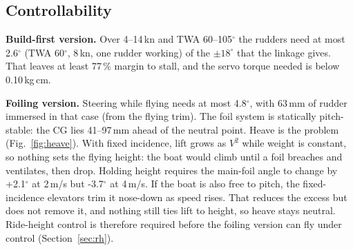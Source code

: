 \documentclass[10pt,twocolumn]{article}
\begin{document}
\begin{table}[t]
\centering\small
\caption{Take-off speed and the lowest true wind (kn) at which the foiling version takes off.}
\label{tab:sens}
\end{table}

\subsection{Controllability}
\textbf{Build-first version.} Over 4--14\,kn and TWA 60--105$^\circ$ the rudders need at most 2.6$^\circ$ (TWA 60$^\circ$, 8\,kn, one rudder working) of the $\pm18^\circ$ that the linkage gives. That leaves at least 77\,\% margin to stall, and the servo torque needed is below 0.10\,kg\,cm.

\noindent\textbf{Foiling version.} Steering while flying needs at most 4.8$^\circ$, with 63\,mm of rudder immersed in that case (from the flying trim). The foil system is statically pitch-stable: the CG lies 41--97\,mm ahead of the neutral point. Heave is the problem (Fig.~\ref{fig:heave}). With fixed incidence, lift grows as $V^2$ while weight is constant, so nothing sets the flying height: the boat would climb until a foil breaches and ventilates, then drop. Holding height requires the main-foil angle to change by +2.1$^\circ$ at 2\,m/s but -3.7$^\circ$ at 4\,m/s. If the boat is also free to pitch, the fixed-incidence elevators trim it nose-down as speed rises. That reduces the excess but does not remove it, and nothing still ties lift to height, so heave stays neutral. Ride-height control is therefore required before the foiling version can fly under control (Section~\ref{sec:rh}).
\end{document}
